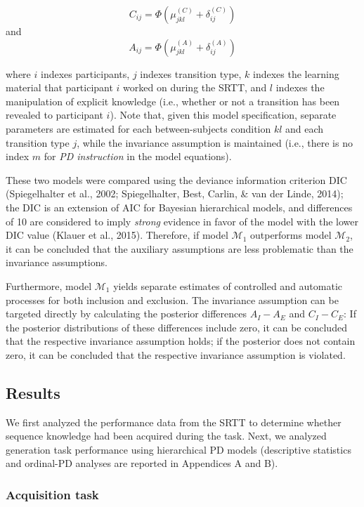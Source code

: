 \documentclass[man]{apa6}
\theoremstyle{definition}
\theoremstyle{definition}
\theoremstyle{definition}
\theoremstyle{remark}
\begin{document}
\[
  C_{ij} = \Phi(\mu_{jkl}^{(C)} + \delta_{ij}^{(C)})
\] and \[
  A_{ij} = \Phi(\mu_{jkl}^{(A)} + \delta_{ij}^{(A)})
\]

where \(i\) indexes participants, \(j\) indexes transition type, \(k\)
indexes the learning material that participant \(i\) worked on during
the SRTT, and \(l\) indexes the manipulation of explicit knowledge
(i.e., whether or not a transition has been revealed to participant
\(i\)). Note that, given this model specification, separate parameters
are estimated for each between-subjects condition \(kl\) and each
transition type \(j\), while the invariance assumption is maintained
(i.e., there is no index \(m\) for \emph{PD instruction} in the model
equations).

These two models were compared using the deviance information criterion
DIC (Spiegelhalter et al., 2002; Spiegelhalter, Best, Carlin, \& van der
Linde, 2014); the DIC is an extension of AIC for Bayesian hierarchical
models, and differences of 10 are considered to imply \emph{strong}
evidence in favor of the model with the lower DIC value (Klauer et al.,
2015). Therefore, if model \(\mathcal{M}_1\) outperforms model
\(\mathcal{M}_2\), it can be concluded that the auxiliary assumptions
are less problematic than the invariance assumptions.

Furthermore, model \(\mathcal{M}_1\) yields separate estimates of
controlled and automatic processes for both inclusion and exclusion. The
invariance assumption can be targeted directly by calculating the
posterior differences \(A_{I} - A_{E}\) and \(C_{I} - C_{E}\): If the
posterior distributions of these differences include zero, it can be
concluded that the respective invariance assumption holds; if the
posterior does not contain zero, it can be concluded that the respective
invariance assumption is violated.

\subsection{Results}\label{results-1}

We first analyzed the performance data from the SRTT to determine
whether sequence knowledge had been acquired during the task. Next, we
analyzed generation task performance using hierarchical PD models
(descriptive statistics and ordinal-PD analyses are reported in
Appendices A and B).

\subsubsection{Acquisition task}\label{acquisition-task-1}
\end{document}
